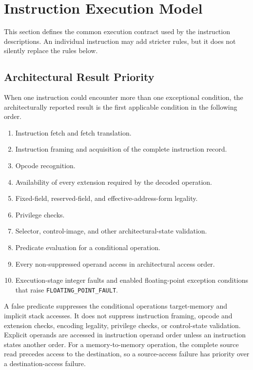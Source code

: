 \clearpage
\section{Instruction Execution Model}\label{page:instruction-execution-model}

This section defines the common execution contract used by the instruction descriptions. An individual
instruction may add stricter rules, but it does not silently replace the rules below.

\subsection{Architectural Result Priority}
When one instruction could encounter more than one exceptional condition, the architecturally reported result is
the first applicable condition in the following order.

\begin{enumerate}
\item Instruction fetch and fetch translation.
\item Instruction framing and acquisition of the complete instruction record.
\item Opcode recognition.
\item Availability of every extension required by the decoded operation.
\item Fixed-field, reserved-field, and effective-address-form legality.
\item Privilege checks.
\item Selector, control-image, and other architectural-state validation.
\item Predicate evaluation for a conditional operation.
\item Every non-suppressed operand access in architectural access order.
\item Execution-stage integer faults and enabled floating-point exception conditions that raise
\texttt{FLOATING\_POINT\_FAULT}.
\end{enumerate}

A false predicate suppresses the conditional operation\textquotesingle{}s target-memory and implicit stack accesses. It does not
suppress instruction framing, opcode and extension checks, encoding legality, privilege checks, or control-state
validation. Explicit operands are accessed in instruction operand order unless an instruction states another order.
For a memory-to-memory operation, the complete source read precedes access to the destination, so a source-access
failure has priority over a destination-access failure.

